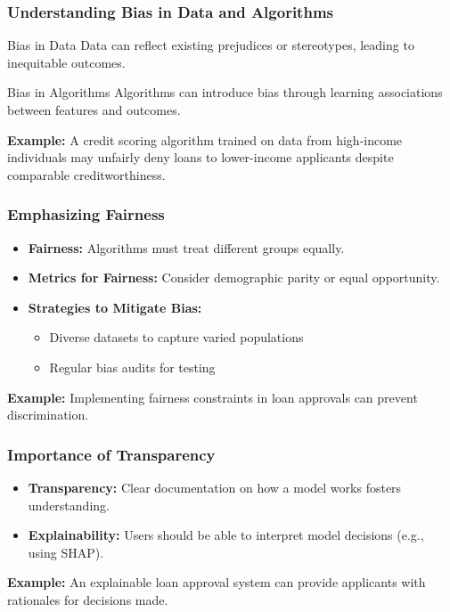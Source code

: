 \documentclass[aspectratio=169]{beamer}
\begin{document}
\begin{frame}[fragile]
    \frametitle{Understanding Bias in Data and Algorithms}
    \begin{block}{Bias in Data}
        Data can reflect existing prejudices or stereotypes, leading to inequitable outcomes. 
    \end{block}
    \begin{block}{Bias in Algorithms}
        Algorithms can introduce bias through learning associations between features and outcomes.
    \end{block}
    
    \textbf{Example:} A credit scoring algorithm trained on data from high-income individuals may unfairly deny loans to lower-income applicants despite comparable creditworthiness.
\end{frame}

\begin{frame}[fragile]
    \frametitle{Emphasizing Fairness}
    \begin{itemize}
        \item \textbf{Fairness:} Algorithms must treat different groups equally.
        \item \textbf{Metrics for Fairness:} Consider demographic parity or equal opportunity.
        \item \textbf{Strategies to Mitigate Bias:}
        \begin{itemize}
            \item Diverse datasets to capture varied populations
            \item Regular bias audits for testing
        \end{itemize}
    \end{itemize}
    
    \textbf{Example:} Implementing fairness constraints in loan approvals can prevent discrimination.
\end{frame}

\begin{frame}[fragile]
    \frametitle{Importance of Transparency}
    \begin{itemize}
        \item \textbf{Transparency:} Clear documentation on how a model works fosters understanding.
        \item \textbf{Explainability:} Users should be able to interpret model decisions (e.g., using SHAP).
    \end{itemize}

    \textbf{Example:} An explainable loan approval system can provide applicants with rationales for decisions made.
\end{frame}
\end{document}
